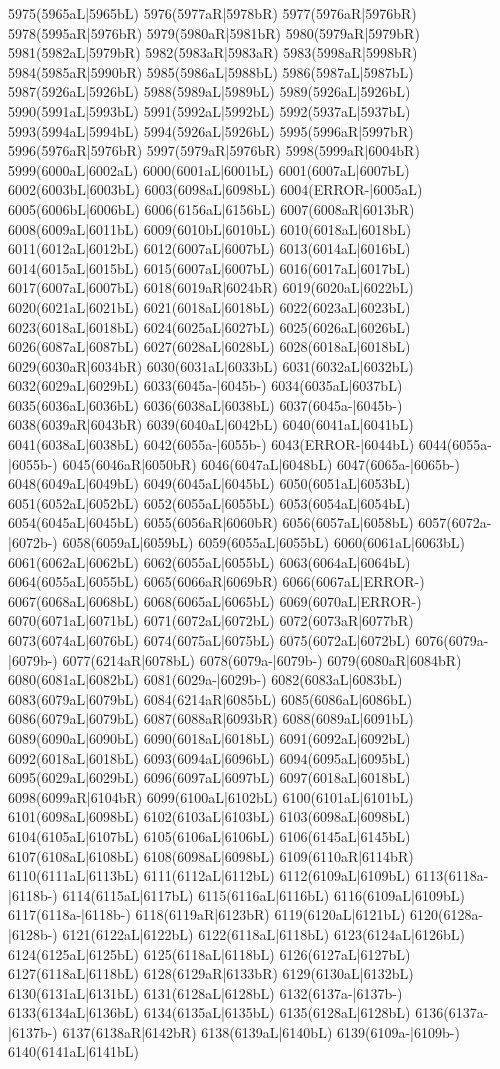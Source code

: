 5975(5965aL|5965bL) 5976(5977aR|5978bR) 5977(5976aR|5976bR) 5978(5995aR|5976bR) 5979(5980aR|5981bR) 5980(5979aR|5979bR) 5981(5982aL|5979bR) 5982(5983aR|5983aR) 5983(5998aR|5998bR) 5984(5985aR|5990bR) 5985(5986aL|5988bL) 5986(5987aL|5987bL) 5987(5926aL|5926bL) 5988(5989aL|5989bL) 5989(5926aL|5926bL) 5990(5991aL|5993bL) 5991(5992aL|5992bL) 5992(5937aL|5937bL) 5993(5994aL|5994bL) 5994(5926aL|5926bL) 5995(5996aR|5997bR) 5996(5976aR|5976bR) 5997(5979aR|5976bR) 5998(5999aR|6004bR) 5999(6000aL|6002aL) 6000(6001aL|6001bL) 6001(6007aL|6007bL) 6002(6003bL|6003bL) 6003(6098aL|6098bL) 6004(ERROR-|6005aL) 6005(6006bL|6006bL) 6006(6156aL|6156bL) 6007(6008aR|6013bR) 6008(6009aL|6011bL) 6009(6010bL|6010bL) 6010(6018aL|6018bL) 6011(6012aL|6012bL) 6012(6007aL|6007bL) 6013(6014aL|6016bL) 6014(6015aL|6015bL) 6015(6007aL|6007bL) 6016(6017aL|6017bL) 6017(6007aL|6007bL) 6018(6019aR|6024bR) 6019(6020aL|6022bL) 6020(6021aL|6021bL) 6021(6018aL|6018bL) 6022(6023aL|6023bL) 6023(6018aL|6018bL) 6024(6025aL|6027bL) 6025(6026aL|6026bL) 6026(6087aL|6087bL) 6027(6028aL|6028bL) 6028(6018aL|6018bL) 6029(6030aR|6034bR) 6030(6031aL|6033bL) 6031(6032aL|6032bL) 6032(6029aL|6029bL) 6033(6045a-|6045b-) 6034(6035aL|6037bL) 6035(6036aL|6036bL) 6036(6038aL|6038bL) 6037(6045a-|6045b-) 6038(6039aR|6043bR) 6039(6040aL|6042bL) 6040(6041aL|6041bL) 6041(6038aL|6038bL) 6042(6055a-|6055b-) 6043(ERROR-|6044bL) 6044(6055a-|6055b-) 6045(6046aR|6050bR) 6046(6047aL|6048bL) 6047(6065a-|6065b-) 6048(6049aL|6049bL) 6049(6045aL|6045bL) 6050(6051aL|6053bL) 6051(6052aL|6052bL) 6052(6055aL|6055bL) 6053(6054aL|6054bL) 6054(6045aL|6045bL) 6055(6056aR|6060bR) 6056(6057aL|6058bL) 6057(6072a-|6072b-) 6058(6059aL|6059bL) 6059(6055aL|6055bL) 6060(6061aL|6063bL) 6061(6062aL|6062bL) 6062(6055aL|6055bL) 6063(6064aL|6064bL) 6064(6055aL|6055bL) 6065(6066aR|6069bR) 6066(6067aL|ERROR-) 6067(6068aL|6068bL) 6068(6065aL|6065bL) 6069(6070aL|ERROR-) 6070(6071aL|6071bL) 6071(6072aL|6072bL) 6072(6073aR|6077bR) 6073(6074aL|6076bL) 6074(6075aL|6075bL) 6075(6072aL|6072bL) 6076(6079a-|6079b-) 6077(6214aR|6078bL) 6078(6079a-|6079b-) 6079(6080aR|6084bR) 6080(6081aL|6082bL) 6081(6029a-|6029b-) 6082(6083aL|6083bL) 6083(6079aL|6079bL) 6084(6214aR|6085bL) 6085(6086aL|6086bL) 6086(6079aL|6079bL) 6087(6088aR|6093bR) 6088(6089aL|6091bL) 6089(6090aL|6090bL) 6090(6018aL|6018bL) 6091(6092aL|6092bL) 6092(6018aL|6018bL) 6093(6094aL|6096bL) 6094(6095aL|6095bL) 6095(6029aL|6029bL) 6096(6097aL|6097bL) 6097(6018aL|6018bL) 6098(6099aR|6104bR) 6099(6100aL|6102bL) 6100(6101aL|6101bL) 6101(6098aL|6098bL) 6102(6103aL|6103bL) 6103(6098aL|6098bL) 6104(6105aL|6107bL) 6105(6106aL|6106bL) 6106(6145aL|6145bL) 6107(6108aL|6108bL) 6108(6098aL|6098bL) 6109(6110aR|6114bR) 6110(6111aL|6113bL) 6111(6112aL|6112bL) 6112(6109aL|6109bL) 6113(6118a-|6118b-) 6114(6115aL|6117bL) 6115(6116aL|6116bL) 6116(6109aL|6109bL) 6117(6118a-|6118b-) 6118(6119aR|6123bR) 6119(6120aL|6121bL) 6120(6128a-|6128b-) 6121(6122aL|6122bL) 6122(6118aL|6118bL) 6123(6124aL|6126bL) 6124(6125aL|6125bL) 6125(6118aL|6118bL) 6126(6127aL|6127bL) 6127(6118aL|6118bL) 6128(6129aR|6133bR) 6129(6130aL|6132bL) 6130(6131aL|6131bL) 6131(6128aL|6128bL) 6132(6137a-|6137b-) 6133(6134aL|6136bL) 6134(6135aL|6135bL) 6135(6128aL|6128bL) 6136(6137a-|6137b-) 6137(6138aR|6142bR) 6138(6139aL|6140bL) 6139(6109a-|6109b-) 6140(6141aL|6141bL) 